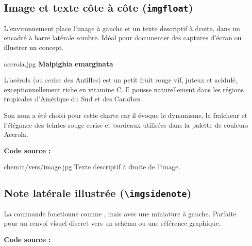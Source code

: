 \subsection{Image et texte côte à côte (\texttt{imgfloat})}

L'environnement  place l'image à gauche et un texte descriptif à droite, dans un encadré à barre latérale sombre. Idéal pour documenter des captures d'écran ou illustrer un concept.

\begin{imgfloat}{acerola.jpg}
  \textbf{Malpighia emarginata}

  L'acérola (ou cerise des Antilles) est un petit fruit rouge vif, juteux et acidulé, exceptionnellement riche en vitamine C. Il pousse naturellement dans les régions tropicales d'Amérique du Sud et des Caraïbes.

  \vspace{4pt}
  Son nom a été choisi pour cette charte car il évoque le dynamisme, la fraîcheur et l'élégance des teintes rouge cerise et bordeaux utilisées dans la palette de couleurs Acerola.
\end{imgfloat}

\textbf{Code source :}
\begin{texblock}
\begin{imgfloat}{chemin/vers/image.jpg}
  Texte descriptif à droite de l'image.
\end{imgfloat}
\end{texblock}

\subsection{Note latérale illustrée (\texttt{\textbackslash imgsidenote})}

La commande  fonctionne comme , mais avec une miniature à gauche. Parfaite pour un renvoi visuel discret vers un schéma ou une référence graphique.


\textbf{Code source :}
\begin{texblock}
\end{texblock}


